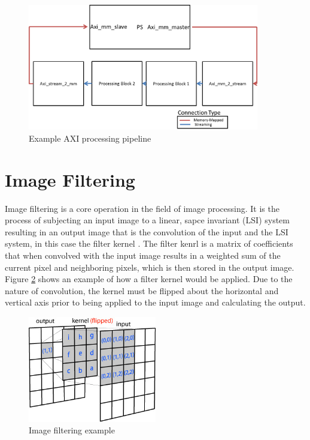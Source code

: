 \begin{figure}[!h]
  \centering
  \includegraphics[width=0.9\textwidth]{./img/axi_pipeline.png}
  \caption{Example AXI processing pipeline}
  \label{fig:axi_pipeline}
\end{figure}

\section{Image Filtering}
Image filtering is a core operation in the field of image processing.  It is the process of subjecting an input image to a linear, sapce invariant (LSI) system resulting in an output image that is the convolution of the input and the LSI system, in this case the filter kernel \cite{jain1995machine}.  The filter kenrl is a matrix of coefficients that when convolved with the input image results in a weighted sum of the current pixel and neighboring pixels, which is then stored in the output image.  Figure \ref{fig:filter_example} shows an example of how a filter kernel would be applied.  Due to the nature of convolution, the kernel must be flipped about the horizontal and vertical axis prior to being applied to the input image and calculating the output.
\begin{figure}[!h]
  \centering
  \includegraphics[width = 0.5\textwidth]{./img/filter_example.jpg}
  \caption{Image filtering example}
  \label{fig:filter_example}
\end{figure}


